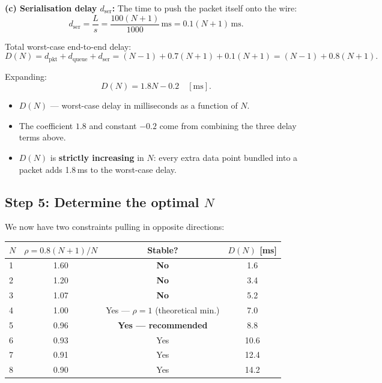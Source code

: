 \documentclass[12pt, a4paper]{article}
\begin{document}
\textbf{(c) Serialisation delay $d_\text{ser}$:}
The time to push the packet itself onto the wire:
\[
  d_\text{ser} = \frac{L}{s}
  = \frac{100(N+1)}{1000}\,\mathrm{ms}
  = 0.1(N+1)\,\mathrm{ms}.
\]

Total worst-case end-to-end delay:
\[
  D(N) = d_\text{pkt} + d_\text{queue} + d_\text{ser}
  = (N-1) + 0.7(N+1) + 0.1(N+1)
  = (N-1) + 0.8(N+1).
\]

Expanding:
\[
  \boxed{D(N) = 1.8N - 0.2 \quad [\mathrm{ms}].}
\]
\begin{itemize}[leftmargin=1.4em, itemsep=2pt]
  \item $D(N)$ --- worst-case delay in milliseconds as a function of $N$.
  \item The coefficient $1.8$ and constant $-0.2$ come from combining the three
    delay terms above.
  \item $D(N)$ is \textbf{strictly increasing} in $N$: every extra data point
    bundled into a packet adds 1.8\,ms to the worst-case delay.
\end{itemize}

\subsection*{Step 5: Determine the optimal $N$}

We now have two constraints pulling in opposite directions:

\begin{center}
\begin{tabular}{lccc}
\toprule
$N$ & $\rho = 0.8(N+1)/N$ & Stable? & $D(N)$ [ms] \\
\midrule
1 & 1.60 & \textbf{No}  & 1.6  \\
2 & 1.20 & \textbf{No}  & 3.4  \\
3 & 1.07 & \textbf{No}  & 5.2  \\
\rowcolor{keybluebg}
4 & 1.00 & Yes --- $\rho=1$ (theoretical min.) & 7.0  \\
\rowcolor{defgreenbg}
5 & 0.96 & \textbf{Yes --- recommended} & 8.8  \\
6 & 0.93 & Yes & 10.6 \\
7 & 0.91 & Yes & 12.4 \\
8 & 0.90 & Yes & 14.2 \\
\bottomrule
\end{tabular}
\end{center}
\end{document}
